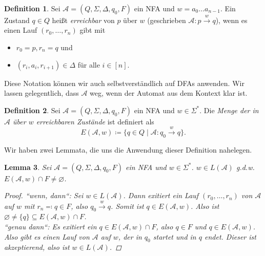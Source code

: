 \documentclass[11pt, a4paper]{article}
\theoremstyle{definition}
\newtheorem{definition}{Definition}[section]
\theoremstyle{plain}
\newtheorem{lemma}[definition]{Lemma}
\numberwithin{equation}{section}
\newcommand{\reaches}[1]{\overset{#1}{\rightarrow}}
\let\emptyset\varnothing
\begin{document}
\begin{definition}\label{def:reachability}
	Sei \( \mathcal{A} = (Q, \Sigma, \Delta, q_0, F) \) ein NFA und \( w = a_0 \ldots a_{n-1} \). Ein Zustand \( q \in Q \) heißt \textit{erreichbar} von \( p \) über \( w \) (geschrieben \( \mathcal{A}: p \reaches{w} q \)), wenn es einen Lauf \( (r_0, \ldots, r_n) \) gibt mit 
	\begin{itemize}
		\item \( r_0 = p, r_n = q \) und
		\item \( (r_i, a_i, r_{i+1}) \in \Delta \) für alle \( i \in [n] \).
	\end{itemize}
\end{definition}
Diese Notation können wir auch selbstverständlich auf DFAs anwenden. Wir lassen gelegentlich, dass \( \mathcal{A} \) weg, wenn der Automat aus dem Kontext klar ist.
\begin{definition}
	Sei \( \mathcal{A} = (Q, \Sigma, \Delta, q_0, F) \) ein NFA und \( w \in \Sigma^\ast \). Die \textit{Menge der in \( \mathcal{A} \) über \( w \) erreichbaren Zustände} ist definiert als
	\[
		E(\mathcal{A}, w) \coloneqq \{ q \in Q \mid \mathcal{A}: q_0 \reaches{w} q \}.
	\]
\end{definition}
Wir haben zwei Lemmata, die uns die Anwendung dieser Definition nahelegen.
\begin{lemma}\label{lem:reach1}
	Sei \( \mathcal{A} = (Q, \Sigma, \Delta, q_0, F)\) ein NFA und \( w \in \Sigma^\ast \). \( w \in L(\mathcal{A}) \) {g.d.w.} \( E(\mathcal{A}, w) \cap F \neq \emptyset \).
	\begin{proof}
		``wenn, dann``: Sei \( w \in L(\mathcal{A}) \). Dann exitiert ein Lauf \( (r_0, \ldots, r_n) \) von \( \mathcal{A} \) auf \( w \) mit \( r_n \eqqcolon q \in F \), also \( q_0 \reaches{w} q \). Somit ist \( q \in E(\mathcal{A}, w) \). Also ist \( \emptyset \neq \{q\} \subseteq E(\mathcal{A}, w) \cap F \).\\
		``genau dann``: Es exitiert ein \( q \in E(\mathcal{A}, w) \cap F \), also \( q \in F \) und \( q \in E(\mathcal{A}, w) \). Also gibt es einen Lauf von \( \mathcal{A} \) auf \( w \), der in \( q_0 \) startet und in \( q \) endet. Dieser ist akzeptierend, also ist \( w \in L(\mathcal{A}) \).
	\end{proof}
\end{lemma}
\end{document}
